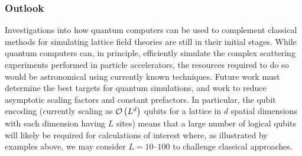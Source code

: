 \begin{refsection}
\subsubsection*{Outlook}
Investigations into how quantum computers can be used to complement classical methods for simulating lattice field theories are still in their initial stages. While quantum computers can, in principle, efficiently simulate the complex scattering experiments performed in particle accelerators, the resources required to do so would be astronomical using currently known techniques. Future work must determine the best targets for quantum simulations, and work to reduce asymptotic scaling factors and constant prefactors. In particular, the qubit encoding (currently scaling as $\mathcal{O}\left( L^d \right)$ qubits for a lattice in $d$ spatial dimensions with each dimension having $L$ sites) means that a large number of logical qubits will likely be required for calculations of interest where, as illustrated by examples above, we may consider $L = 10$--$100$ to challenge classical approaches.


\printbibliography[heading=secbib,segment=\therefsegment]

\end{refsection}










\newpage


